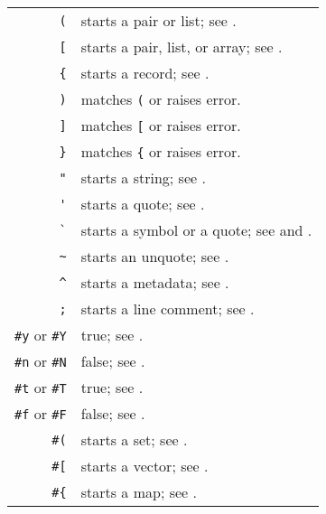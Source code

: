 \begin{table}
\begin{longtable}{ r l }
  \lstinline!(! & starts a pair or list; see \nameref{subsec:aml-base-lang-reader-lists}. \\
  \lstinline![! & starts a pair, list, or array; see \nameref{subsec:aml-base-lang-reader-lists}. \\
  \lstinline!{! & starts a record; see \nameref{subsec:aml-base-lang-reader-records}. \\
  \lstinline!)! & matches \lstinline!(! or raises error. \\
  \lstinline!]! & matches \lstinline![! or raises error. \\
  \lstinline!}! & matches \lstinline!{! or raises error. \\
  
\pagebreak[2]
  \lstinline!"! & starts a string; see \nameref{subsec:aml-base-lang-reader-strings}. \\
  \lstinline!'! & starts a quote; see \nameref{subsec:aml-base-lang-reader-quotes}. \\
  \lstinline!`! & starts a symbol or a quote; see \nameref{subsec:aml-base-lang-reader-symbols} and \nameref{subsec:aml-base-lang-reader-quotes}. \\
  \lstinline!~! & starts an unquote; see \nameref{subsec:aml-base-lang-reader-quotes}. \\
  \lstinline!^! & starts a metadata; see \nameref{subsec:aml-base-lang-reader-metadata}. \\
  \lstinline!;! & starts a line comment; see \nameref{subsec:aml-base-lang-reader-comments}. \\
  
\pagebreak[2]
  \lstinline!#y! or \lstinline!#Y! & true; see \nameref{subsec:aml-base-lang-reader-booleans}. \\
  \lstinline!#n! or \lstinline!#N! & false; see \nameref{subsec:aml-base-lang-reader-booleans}. \\
  \lstinline!#t! or \lstinline!#T! & true; see \nameref{subsec:aml-base-lang-reader-booleans}. \\
  \lstinline!#f! or \lstinline!#F! & false; see \nameref{subsec:aml-base-lang-reader-booleans}. \\  
  
  \lstinline!#(! & starts a set; see \nameref{subsec:aml-base-lang-reader-sets}. \\
  \lstinline!#[! & starts a vector; see \nameref{subsec:aml-base-lang-reader-vectors}. \\
  \lstinline!#{! & starts a map; see \nameref{subsec:aml-base-lang-reader-maps}. \\
  

\end{longtable}
\end{table}
